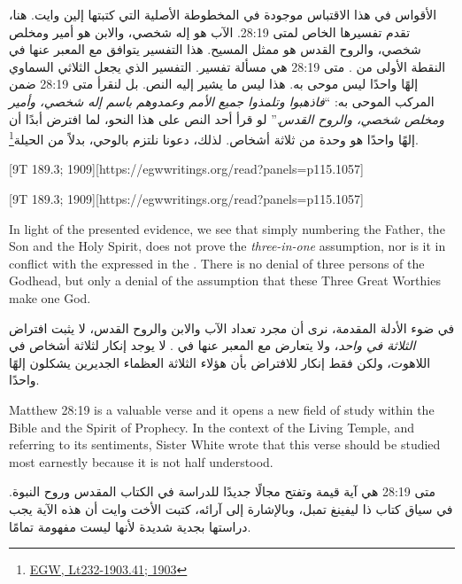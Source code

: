 الأقواس في هذا الاقتباس موجودة في المخطوطة الأصلية التي كتبتها إلين وايت. هنا، تقدم تفسيرها الخاص لمتى 28:19. الآب هو إله شخصي، والابن هو أمير ومخلص شخصي، والروح القدس هو ممثل المسيح. هذا التفسير يتوافق مع  المعبر عنها في النقطة الأولى من . متى 28:19 هي مسألة تفسير. التفسير الذي يجعل الثلاثي السماوي إلهًا واحدًا ليس موحى به. هذا ليس ما يشير إليه النص. بل لنقرأ متى 28:19 ضمن المركب الموحى به: “\textit{فاذهبوا وتلمذوا جميع الأمم وعمدوهم باسم إله شخصي، وأمير ومخلص شخصي، والروح القدس}.” لو قرأ أحد النص على هذا النحو، لما افترض أبدًا أن إلهًا واحدًا هو وحدة من ثلاثة أشخاص. لذلك، دعونا نلتزم بالوحي، بدلاً من الحيلة\footnote{\href{https://egwwritings.org/?ref=en\_Lt232-1903.41&para=10197.50}{{EGW, Lt232-1903.41; 1903}}}.


[9T 189.3; 1909][https://egwwritings.org/read?panels=p115.1057]


[9T 189.3; 1909][https://egwwritings.org/read?panels=p115.1057]


In light of the presented evidence, we see that simply numbering the Father, the Son and the Holy Spirit, does not prove the \textit{three-in-one} assumption, nor is it in conflict with the  expressed in the . There is no denial of three persons of the Godhead, but only a denial of the assumption that these Three Great Worthies make one God.


في ضوء الأدلة المقدمة، نرى أن مجرد تعداد الآب والابن والروح القدس، لا يثبت افتراض \textit{الثلاثة في واحد}، ولا يتعارض مع  المعبر عنها في . لا يوجد إنكار لثلاثة أشخاص في اللاهوت، ولكن فقط إنكار للافتراض بأن هؤلاء الثلاثة العظماء الجديرين يشكلون إلهًا واحدًا.


Matthew 28:19 is a valuable verse and it opens a new field of study within the Bible and the Spirit of Prophecy. In the context of the Living Temple, and referring to its sentiments, Sister White wrote that this verse should be studied most earnestly because it is not half understood.


متى 28:19 هي آية قيمة وتفتح مجالًا جديدًا للدراسة في الكتاب المقدس وروح النبوة. في سياق كتاب ذا ليفينغ تمبل، وبالإشارة إلى آرائه، كتبت الأخت وايت أن هذه الآية يجب دراستها بجدية شديدة لأنها ليست مفهومة تمامًا.


